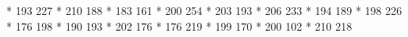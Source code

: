 * 193 227
* 210 188
* 183 161
* 200 254
* 203 193
* 206 233
* 194 189
* 198 226
* 176 198
* 190 193
* 202 176
* 176 219
* 199 170
* 200 102
* 210 218

\stopencoding

\endinput 
